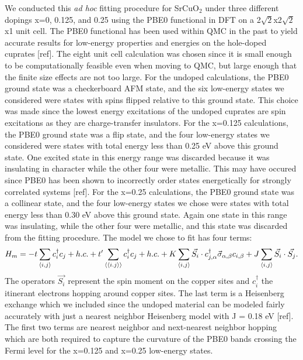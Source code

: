 \documentclass{article}
\begin{document}
We conducted this \textit{ad hoc} fitting procedure for SrCuO$_2$ under three different dopings x=0, 0.125, and 0.25 using the PBE0 functional in DFT on a 2$\sqrt{2}$x2$\sqrt{2}$x1 unit cell. 
The PBE0 functional has been used within QMC in the past to yield accurate results for low-energy properties and energies on the hole-doped cuprates [ref]. 
The eight unit cell calculation was chosen since it is small enough to be computationally feasible even when moving to QMC, but large enough that the finite size effects are not too large. 
For the undoped calculations, the PBE0 ground state was a checkerboard AFM state, and the six low-energy states we considered were states with spins flipped relative to this ground state. 
This choice was made since the lowest energy excitations of the undoped cuprates are spin excitations as they are charge-transfer insulators. 
For the x=0.125 calculations, the PBE0 ground state was a flip state, and the four low-energy states we considered were states with total energy less than 0.25 eV above this ground state. 
One excited state in this energy range was discarded because it was insulating in character while the other four were metallic. 
This may have occured since PBE0 has been shown to incorrectly order states energetically for strongly correlated systems [ref]. 
For the x=0.25 calculations, the PBE0 ground state was a collinear state, and the four low-energy states we chose were states with total energy less than 0.30 eV above this ground state. 
Again one state in this range was insulating, while the other four were metallic, and this state was discarded from the fitting procedure. 
The model we chose to fit has four terms: 
\begin{equation}
H_m = -t \sum_{\langle i,j \rangle} c_i^\dagger c_j + h.c.
+ t^\prime\sum_{\langle \langle i.j \rangle \rangle} c_i^\dagger c_j + h.c. +\\
K\sum_{\langle i,j \rangle} \vec{S_i} \cdot c_{j,\alpha}^\dagger \vec{\sigma}_{\alpha,\beta} c_{i,\beta} + J \sum_{\langle i,j \rangle} \vec{S_i} \cdot \vec{S_j}.
\end{equation}
The operators $\vec{S_i}$ represent the spin moment on the copper sites and $c_i^\dagger$ the itinerant electrons hopping around copper sites. 
The last term is a Heisenberg exchange which we included since the undoped material can be modeled fairly accurately with just a nearest neighbor Heisenberg model with J = 0.18 eV [ref]. 
The first two terms are nearest neighbor and next-nearest neighbor hopping which are both required to capture the curvature of the PBE0 bands crossing the Fermi level for the x=0.125 and x=0.25 low-energy states. 
\end{document}
